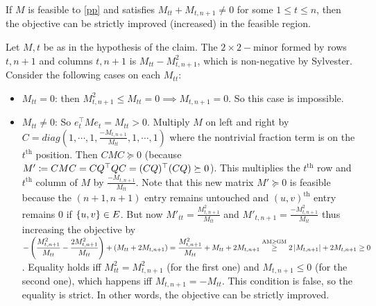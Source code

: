\begin{enumerate}[leftmargin=*]
\begin{pf}
\begin{cl}If $M$ is feasible to \ref{pp} and satisfies $M_{tt}+M_{t,n+1}\ne 0$ for some $1\le t\le n$, then the objective can be strictly improved (increased) in the feasible region.\end{cl} 
\begin{pf}Let $M,t$ be as in the hypothesis of the claim. The $2\times 2-$minor formed by rows $t,n+1$ and columns $t,n+1$ is $M_{tt}-M_{t,n+1}^{2}$, which is non-negative by Sylvester.  Consider the following cases on each $M_{tt}$:
\begin{itemize}
\item $M_{tt}=0$: then $M_{t,n+1}^{2}\le M_{tt}=0\implies M_{t,n+1}=0$. So this case is impossible.
\item $M_{tt}\ne 0$: So $e_{t}^{\top}Me_{t} = M_{tt}>0$. Multiply $M$ on left and right by $C = diag\left(1,\cdots,1,\frac{-M_{t,n+1}}{M_{tt}},1,\cdots,1\right)$ where the nontrivial fraction term is on the $t^{\text{th}}$ position. Then $CMC\succeq 0$ (because $M'\coloneqq CMC = CQ^{\top}QC = (CQ)^\top(CQ)\succeq0$). This multiplies the $t^{\text{th}}$ row and $t^{\text{th}}$ column of $M$ by $\frac{-M_{t,n+1}}{M_{tt}}$. Note that this new matrix $M'\succeq 0$ is feasible because the $(n+1,n+1)$ entry remains untouched and $(u,v)^{\text{th}}$ entry remains $0$ if $\left\{u,v\right\}\in E$. But now $M'_{tt} = \frac{M_{t,n+1}^{2}}{M_{tt}}$ and $M'_{t,n+1} = \frac{-M_{t,n+1}^{2}}{M_{tt}}$ thus increasing the objective by $\displaystyle -\left(\frac{M_{t,n+1}^{2}}{M_{tt}} - \frac{2M_{t,n+1}^{2}}{M_{tt}}\right) + \left(M_{tt}+2M_{t,n+1}\right) = \frac{M_{t,n+1}^{2}}{M_{tt}} + M_{tt}+2M_{t,n+1} \stackrel{\text{AM}\ge \text{GM}}{\ge}2\left| M_{t,n+1} \right| + 2M_{t,n+1} \ge 0$. Equality holds iff $M_{tt}^{2} = M_{t,n+1}^{2}$ (for the first one) and $M_{t,n+1}\le 0$ (for the second one), which happens iff $M_{t,n+1} = -M_{tt}$. This condition is false, so the equality is strict. In other words, the objective can be strictly improved.\end{itemize}\hfill\qedsymbol\end{pf}


\end{pf}
\end{enumerate}
